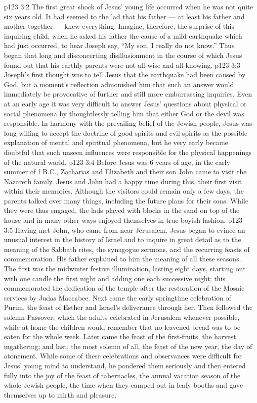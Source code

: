 \vs p123 3:2 \pc The first great shock of Jesus’ young life occurred when he was not quite six years old. It had seemed to the lad that his father --- at least his father and mother together --- knew everything. Imagine, therefore, the surprise of this inquiring child, when he asked his father the cause of a mild earthquake which had just occurred, to hear Joseph say, “My son, I really do not know.” Thus began that long and disconcerting disillusionment in the course of which Jesus found out that his earthly parents were not all\hyp{}wise and all\hyp{}knowing.
\vs p123 3:3 Joseph’s first thought was to tell Jesus that the earthquake had been caused by God, but a moment’s reflection admonished him that such an answer would immediately be provocative of further and still more embarrassing inquiries. Even at an early age it was very difficult to answer Jesus’ questions about physical or social phenomena by thoughtlessly telling him that either God or the devil was responsible. In harmony with the prevailing belief of the Jewish people, Jesus was long willing to accept the doctrine of good spirits and evil spirits as the possible explanation of mental and spiritual phenomena, but he very early became doubtful that such unseen influences were responsible for the physical happenings of the natural world.
\vs p123 3:4 \pc Before Jesus was 6 years of age, in the early summer of 1\,B.C., Zacharias and Elizabeth and their son John came to visit the Nazareth family. Jesus and John had a happy time during this, their first visit within their memories. Although the visitors could remain only a few days, the parents talked over many things, including the future plans for their sons. While they were thus engaged, the lads played with blocks in the sand on top of the house and in many other ways enjoyed themselves in true boyish fashion.
\vs p123 3:5 \pc Having met John, who came from near Jerusalem, Jesus began to evince an unusual interest in the history of Israel and to inquire in great detail as to the meaning of the Sabbath rites, the synagogue sermons, and the recurring feasts of commemoration. His father explained to him the meaning of all these seasons. The first was the midwinter festive illumination, lasting eight days, starting out with one candle the first night and adding one each successive night; this commemorated the dedication of the temple after the restoration of the Mosaic services by Judas Maccabee. Next came the early springtime celebration of Purim, the feast of Esther and Israel’s deliverance through her. Then followed the solemn Passover, which the adults celebrated in Jerusalem whenever possible, while at home the children would remember that no leavened bread was to be eaten for the whole week. Later came the feast of the first\hyp{}fruits, the harvest ingathering; and last, the most solemn of all, the feast of the new year, the day of atonement. While some of these celebrations and observances were difficult for Jesus’ young mind to understand, he pondered them seriously and then entered fully into the joy of the feast of tabernacles, the annual vacation season of the whole Jewish people, the time when they camped out in leafy booths and gave themselves up to mirth and pleasure.
